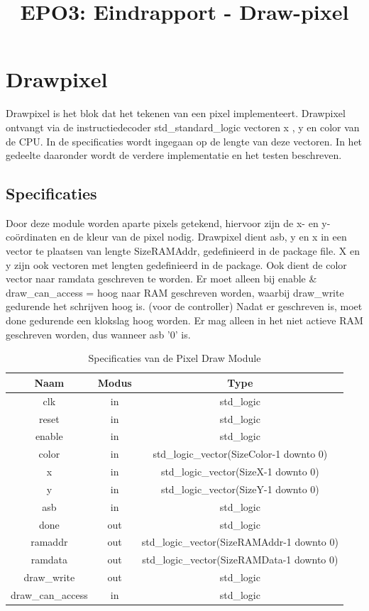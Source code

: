 \documentclass{scrartcl} %
\author{}%
\title{EPO3: Eindrapport - Draw-pixel}
\begin{document}
\section{Drawpixel} %
\label{sec:drawpixel} %

Drawpixel is het blok dat het tekenen van een pixel implementeert. Drawpixel ontvangt via de instructiedecoder std\_standard\_logic vectoren x , y en color van de CPU. In de specificaties wordt ingegaan  op de lengte van deze vectoren. In het gedeelte daaronder wordt de verdere implementatie en het testen beschreven.

\subsection{Specificaties}
\label{ssec:specs_dp}
Door deze module worden aparte pixels getekend, hiervoor zijn de x- en y-coördinaten en de kleur van de pixel nodig. Drawpixel dient asb, y en x in een vector te plaatsen van lengte SizeRAMAddr, gedefinieerd in de package file. X en y zijn ook vectoren met lengten gedefinieerd in de package. Ook dient de color vector naar ramdata geschreven te worden.  Er moet alleen bij enable \& draw\_can\_access = hoog naar RAM geschreven worden, waarbij draw\_write gedurende het schrijven hoog is. (voor de controller)  Nadat er geschreven is, moet done gedurende een klokslag hoog worden. Er mag alleen in het niet actieve RAM geschreven worden, dus wanneer asb '0' is. 

\begin{table}[H]
\centering
\caption{Specificaties van de Pixel Draw Module}
\label{tab:spec-pixel-draw}
\begin{tabular}{c c c}
	\hline\hline
 	Naam & Modus & Type\\
 	\hline	
	clk & in & std\_logic \\
	reset & in & std\_logic \\
	enable& in & std\_logic \\
	color & in & std\_logic\_vector(SizeColor-1 downto 0) \\
	x & in & std\_logic\_vector(SizeX-1 downto 0) \\
	y & in & std\_logic\_vector(SizeY-1 downto 0) \\
	asb & in & std\_logic \\
	done & out & std\_logic \\
	ramaddr &out & std\_logic\_vector(SizeRAMAddr-1 downto 0) \\
	ramdata &out & std\_logic\_vector(SizeRAMData-1 downto 0) \\
	draw\_write &out & std\_logic \\
	draw\_can\_access & in & std\_logic \\
  	\hline
\end{tabular}
\end{table}
\end{document}
